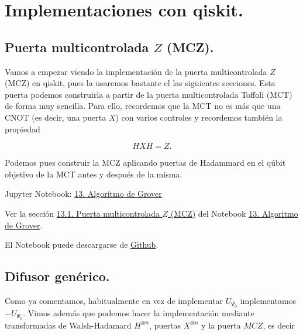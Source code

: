 \documentclass[a4paper,11pt]{book} %
\numberwithin{equation}{chapter}
\begin{document}
\section{Implementaciones con qiskit.}

\subsection{Puerta multicontrolada $Z$ (MCZ).}

Vamos a empezar viendo la implementación de la puerta multicontrolada $Z$ (MCZ) en qiskit, pues la usaremos bastante el las siguientes secciones. Esta puerta podemos construirla a partir de la puerta multicontrolada Toffoli (MCT) de forma muy sencilla. Para ello, recordemos que la MCT no es más que una CNOT (es decir, una puerta $X$) con varios controles y recordemos también la propiedad

\begin{equation} \label{Imple_HXH_Z}
HXH = Z .
\end{equation}

Podemos pues construir la MCZ aplicando puertas de Hadammard en el qúbit objetivo de la MCT antes y después de la misma.

    \begin{mybox_orange}{Jupyter Notebook: \href{https://www.scbi.uma.es/web/wp-content/uploads/Jupyterbook/CICC_UMA/Notebooks/html/docs/Part_01/Chapter_13-Grover_Algorithm_myst.html}{13. Algoritmo de Grover}}
  
   Ver la sección \href{https://www.scbi.uma.es/web/wp-content/uploads/Jupyterbook/CICC_UMA/Notebooks/html/docs/Part_01/Chapter_13-Grover_Algorithm_myst.html#puerta-multicontrolada-z-mcz}{13.1. Puerta multicontrolada $Z$ (MCZ)} del  Notebook \href{https://www.scbi.uma.es/web/wp-content/uploads/Jupyterbook/CICC_UMA/Notebooks/html/docs/Part_01/Chapter_13-Grover_Algorithm_myst.html}{13. Algoritmo de Grover}. 
    
  	El Notebook puede descargarse de \href{https://github.com/davidcb98/CICC_UMA/blob/master/Notebooks/Part_01/Chapter_13-Grover_Algorithm.ipynb}{Github}.
    \end{mybox_orange}




\subsection{Difusor genérico.}

Como ya comentamos, habitualmente en vez de implementar $U_{\Psi_0}$ implementamos $-U_{\Psi_0}$. Vimos además que podemos hacer la implementación mediante transformadas de Walsh-Hadamard $H^{\otimes n}$, puertas $X^{\otimes n}$ y la puerta $MCZ$, es decir
\end{document}
